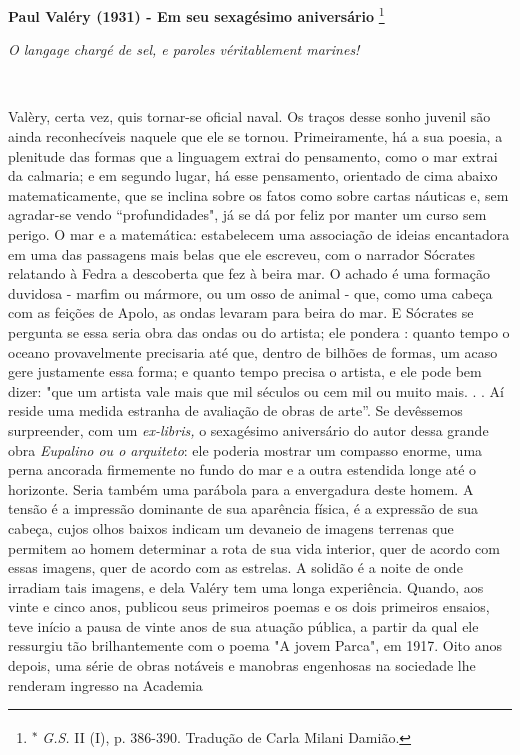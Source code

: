 \textbf{Paul Valéry (1931) - Em seu sexagésimo aniversário} \footnote{\textsuperscript{∗}
  \emph{G.S.} II (I), p. 386-390. Tradução de Carla Milani Damião.}

\emph{O langage chargé de sel, e paroles véritablement marines!}

~

Valèry, certa vez, quis tornar-se oficial naval. Os traços desse sonho
juvenil são ainda reconhecíveis naquele que ele se tornou.
Primeiramente, há a sua poesia, a plenitude das formas que a linguagem
extrai do pensamento, como o mar extrai da calmaria; e em segundo lugar,
há esse pensamento, orientado de cima abaixo matematicamente, que se
inclina sobre os fatos como sobre cartas náuticas e, sem agradar-se
vendo ``profundidades", já se dá por feliz por manter um curso sem
perigo. O mar e a matemática: estabelecem uma associação de ideias
encantadora em uma das passagens mais belas que ele escreveu, com o
narrador Sócrates relatando à Fedra a descoberta que fez à beira mar. O
achado é uma formação duvidosa - marfim ou mármore, ou um osso de animal
- que, como uma cabeça com as feições de Apolo, as ondas levaram para
beira do mar. E Sócrates se pergunta se essa seria obra das ondas ou do
artista; ele pondera : quanto tempo o oceano provavelmente precisaria
até que, dentro de bilhões de formas, um acaso gere justamente essa
forma; e quanto tempo precisa o artista, e ele pode bem dizer: "que um
artista vale mais que mil séculos ou cem mil ou muito mais. . . Aí
reside uma medida estranha de avaliação de obras de arte''. Se
devêssemos surpreender, com um \emph{ex-libris,} o sexagésimo
aniversário do autor dessa grande obra \emph{Eupalino ou o arquiteto}:
ele poderia mostrar um compasso enorme, uma perna ancorada firmemente no
fundo do mar e a outra estendida longe até o horizonte. Seria também uma
parábola para a envergadura deste homem. A tensão é a impressão
dominante de sua aparência física, é a expressão de sua cabeça, cujos
olhos baixos indicam um devaneio de imagens terrenas que permitem ao
homem determinar a rota de sua vida interior, quer de acordo com essas
imagens, quer de acordo com as estrelas. A solidão é a noite de onde
irradiam tais imagens, e dela Valéry tem uma longa experiência. Quando,
aos vinte e cinco anos, publicou seus primeiros poemas e os dois
primeiros ensaios, teve início a pausa de vinte anos de sua atuação
pública, a partir da qual ele ressurgiu tão brilhantemente com o poema
"A jovem Parca", em 1917. Oito anos depois, uma série de obras notáveis
​​e manobras engenhosas na sociedade lhe renderam ingresso na Academia
